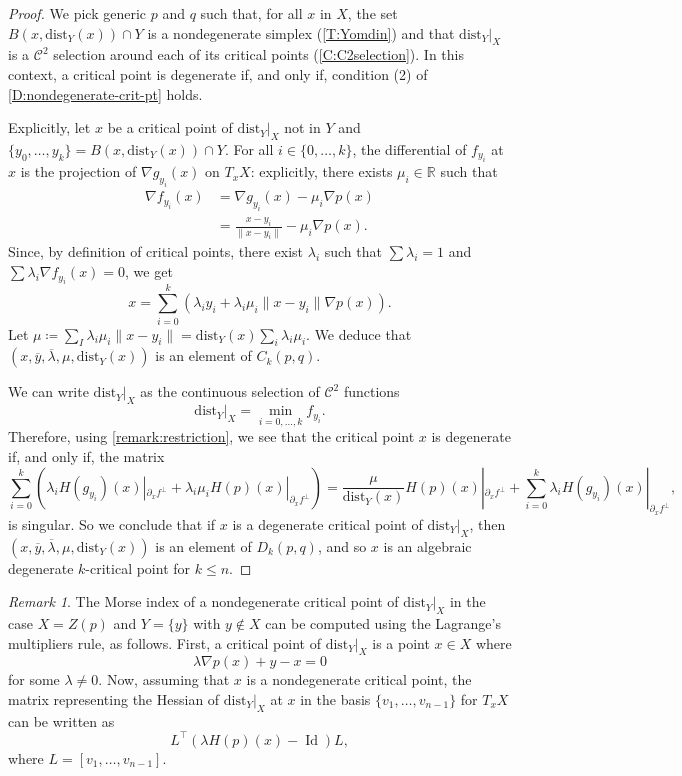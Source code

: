 \documentclass{amsart}
\newcommand{\R}{\mathbb{R}}
\newcommand{\dd}{\mathrm{dist}}
\newcommand{\dist}{{\mathrm{dist}_Y|_X}}
\def\Id{\operatorname{Id}}
\theoremstyle{definition}
\theoremstyle{remark}
\newtheorem{remark}[subsubsection]{Remark}
\begin{document}
\begin{proof}
We pick generic $p$ and $q$ such that, for all $x$ in $X$, the set $B(x, \dd_Y(x)) \cap Y$ is a nondegenerate simplex (\cref{T:Yomdin}) and that $\dist$ is a $\mathcal{C}^2$ selection around each of its critical points (\cref{C:C2selection}). In this context, a critical point is degenerate if, and only if, condition (2) of \cref{D:nondegenerate-crit-pt} holds.

Explicitly, let $x$ be a critical point of $\dist$ not in $Y$ and $\{y_0, \ldots, y_k\} = B(x, \dd_Y(x)) \cap Y$. For all $i \in \{0, \ldots, k\}$, the differential of $f_{y_i}$ at $x$ is the projection of $\nabla g_{y_i}(x)$ on $T_x X$: explicitly, there exists $\mu_i \in \R$ such that
\begin{align}
\label{E:finding-mu}
\nabla f_{y_i}(x) & = \nabla g_{y_i}(x) - \mu_i \nabla p(x) \\
& = \frac{x - y_i}{\|x - y_i\|} - \mu_i \nabla p(x).
\end{align}
Since, by definition of critical points, there exist $\lambda_i$ such that $\sum \lambda_i = 1$ and $\sum \lambda_i \nabla f_{y_i}(x) = 0$, we get
\[
x = \sum_{i = 0}^k (\lambda_i y_i + \lambda_i \mu_i \|x - y_i\| \nabla p(x)).
\]
Let $\mu \coloneqq \sum_I \lambda_i \mu_i \|x - y_i\| = \dd_Y(x) \sum_i \lambda_i \mu_i$. We deduce that $(x, \overline{y}, \overline{\lambda}, \mu, \dd_Y(x))$ is an element of $C_k(p, q)$.

We can write $\dist$ as the continuous selection of $\mathcal{C}^2$ functions
\[
\dist = \min_{i = 0, \ldots, k} f_{y_i}.
\]
Therefore, using \cref{remark:restriction}, we see that the critical point $x$ is degenerate if, and only if, the matrix \[
\sum_{i = 0}^k (\lambda_i H(g_{y_i})(x)|_{\partial_x f^\bot} + \lambda_i \mu_i H(p)(x)|_{\partial_x f^\bot})
=
\frac{\mu}{\dd_Y(x)} H(p)(x)|_{\partial_x f^\bot} + \sum_{i = 0}^k \lambda_i H(g_{y_i})(x)|_{\partial_x f^\bot},
\] is singular. So we conclude that if $x$ is a degenerate critical point of $\dist$, then $(x, \overline{y}, \overline{\lambda}, \mu, \dd_Y(x))$ is an element of $D_k(p, q)$, and so $x$ is an algebraic degenerate $k$-critical point for $k \leq n$.
\end{proof}

\begin{remark}The Morse index of a nondegenerate critical point of $\dist$ in the case $X=Z(p)$ and $Y=\{y\}$ with $y \notin X$ can be computed using the Lagrange's multipliers rule, as follows. First, a critical point of $\dist$ is a point $x\in X$ where 
$$\lambda \nabla p(x)+y-x=0$$
for some $\lambda\neq 0$. Now, assuming that $x$ is a nondegenerate critical point, the matrix representing the Hessian of $\dist$ at $x$ in the basis $\{v_1, \ldots, v_{n - 1}\}$ for $T_xX$ can be written as
$$L^\top\left(\lambda H(p)(x)-\Id\right)L,$$
where $L=[v_1, \ldots, v_{n-1}]$.
\end{remark}
\end{document}
